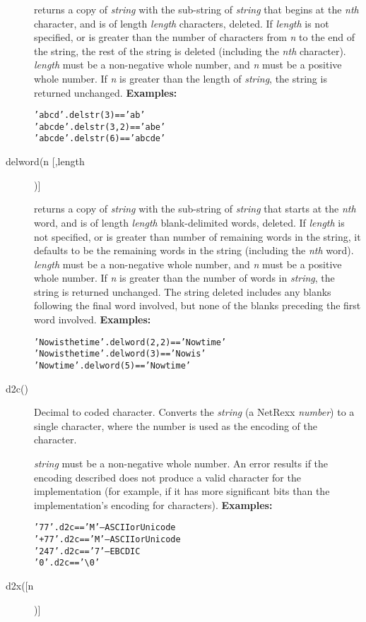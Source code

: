 \begin{description}
returns a copy of \emph{string} with the sub-string of
\emph{string} that begins at the \emph{n}\emph{th} character, and is
of length \emph{length} characters, deleted.
If \emph{length} is not specified, or is greater than the number of
characters from \emph{n} to the end of the string, the rest of the
string is deleted (including the \emph{n}\emph{th} character).
\emph{length} must be a non-negative whole number, and \emph{n}
must be a positive whole number.  If \emph{n} is greater than the
length of \emph{string}, the string is returned unchanged.
 \textbf{Examples:}
\begin{alltt}
'abcd'.delstr(3)    == 'ab'
'abcde'.delstr(3,2) == 'abe'
'abcde'.delstr(6)   == 'abcde'
\end{alltt}
\item[delword(n [,length])]\label{refdelword}

returns a copy of \emph{string} with the sub-string of
\emph{string} that starts at the \emph{n}\emph{th} word, and is of
length \emph{length} blank-delimited words, deleted.
If \emph{length} is not specified, or is greater than number of
remaining words in the string, it defaults to be the remaining words
in the string (including the \emph{n}\emph{th} word).
\emph{length} must be a non-negative whole number, and \emph{n}
must be a positive whole number.  If \emph{n} is greater than the
number of words in \emph{string}, the string is returned unchanged.
The string deleted includes any blanks following the final word
involved, but none of the blanks preceding the first word involved.
 \textbf{Examples:}
\begin{alltt}
'Now is the  time'.delword(2,2) == 'Now time'
'Now is the time '.delword(3)   == 'Now is '
'Now  time'.delword(5)          == 'Now  time'
\end{alltt}
\item[d2c()]\label{refd2c}

Decimal to coded character.
Converts the \emph{string} (a NetRexx \emph{number}) to a
single character, where the number is used as the encoding of the
character.
 
\emph{string} must be a non-negative whole number.
An error results if the encoding described does not produce a valid
character for the implementation (for example, if it has more
significant bits than the implementation's encoding for characters).
 \textbf{Examples:}
\begin{alltt}
'77'.d2c  == 'M' -- ASCII or Unicode
'+77'.d2c == 'M' -- ASCII or Unicode
'247'.d2c == '7' -- EBCDIC
'0'.d2c   == '\textbackslash 0'
\end{alltt}
\item[d2x([n])]\label{refd2x}


\end{description}
